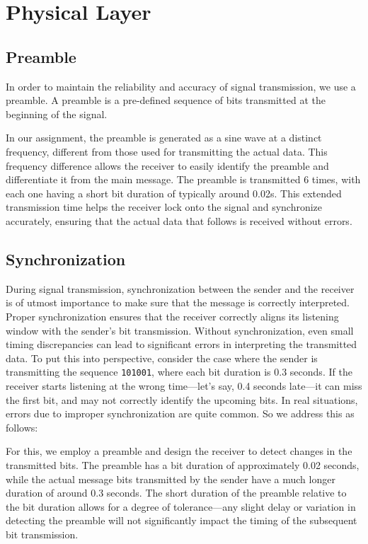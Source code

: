 \documentclass[a4paper,12pt]{article}
\title{\cooltitle{CS378 Lab-3 Design Doc}}
\author{{\bf Saksham (22B1003), Dion (22B0029), Geet (22B1035), Kavya (22b1053)} \\
\small Department of Computer Science \\
Indian Institute of Technology Bombay}
\date{September, 2024}
\begin{document}
\maketitle
\section{Physical Layer}
\subsection{Preamble}
In order to maintain the reliability and accuracy of signal transmission, we use a preamble. A preamble is a pre-defined sequence of bits transmitted at the beginning of the signal. 

In our assignment, the preamble is generated as a sine wave at a distinct frequency, different from those used for transmitting the actual data. This frequency difference allows the receiver to easily identify the preamble and differentiate it from the main message. The preamble is transmitted 6 times, with each one having a short bit duration of typically around 0.02s. This extended transmission time helps the receiver lock onto the signal and synchronize accurately, ensuring that the actual data that follows is received without errors.

\subsection{Synchronization}
During signal transmission, synchronization between the sender and the receiver is of utmost importance to make sure that the message is correctly interpreted. Proper synchronization ensures that the receiver correctly aligns its listening window with the sender's bit transmission. Without synchronization, even small timing discrepancies can lead to significant errors in interpreting the transmitted data. To put this into perspective, consider the case where the sender is transmitting the sequence 
\texttt{101001}, where each bit duration is 0.3 seconds. If the receiver starts listening at the wrong time—let's say, 0.4 seconds late—it can miss the first bit, and may not correctly identify the upcoming bits. In real situations, errors due to improper synchronization are quite common. So we address this as follows:

For this, we employ a preamble and design the receiver to detect changes in the transmitted bits. The preamble has a bit duration of approximately 0.02 seconds, while the actual message bits transmitted by the sender have a much longer duration of around 0.3 seconds. The short duration of the preamble relative to the bit duration allows for a degree of tolerance—any slight delay or variation in detecting the preamble will not significantly impact the timing of the subsequent bit transmission.
\end{document}
